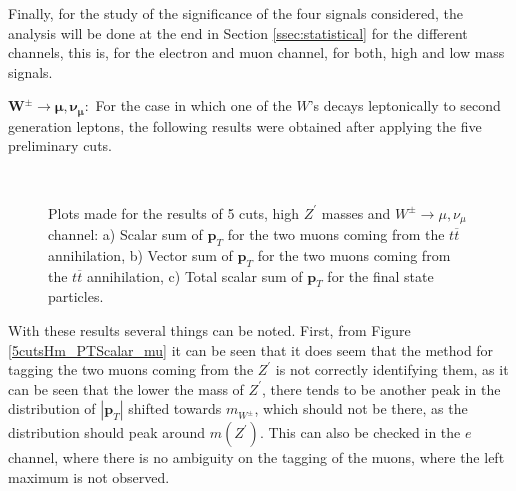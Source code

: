Finally, for the study of the significance of the four signals considered, the analysis will be done at the end in Section \ref{ssec:statistical} for the different channels, this is, for the electron and muon channel, for both, high and low mass signals.

$\bm{W^{\pm} \rightarrow \mu, \nu_{\mu}:}$ For the case in which one of the $W$'s decays leptonically to second generation leptons, the following results were obtained after applying the five preliminary cuts.

\begin{figure}[ht!]
     \begin{center}
        \\
    \end{center}
    \vspace{-1\baselineskip}
    \caption{Plots made for the results of 5 cuts, high $Z^{\prime}$ masses and $W^{\pm}\rightarrow \mu, \nu_{\mu}$ channel: a) Scalar sum of $\bm{p}_T$ for the two muons coming from the $t\overline{ t}$ annihilation, b) Vector sum of $\bm{p}_T$ for the two muons coming from the $t\overline{ t}$ annihilation, c) Total scalar sum of $\bm{p}_T$ for the final state particles.} 
   \label{5cutsHm_Results_mu}
\end{figure}

With these results several things can be noted. First, from Figure \ref{5cutsHm_PTScalar_mu} it can be seen that it does seem that the method for tagging the two muons coming from the $Z^{\prime}$ is not correctly identifying them, as it can be seen that the lower the mass of $Z^{\prime}$, there tends to be another peak in the distribution of $|\bm{p}_T|$ shifted towards $m_{W^{\pm}}$, which should not be there, as the distribution should peak around $m(Z^{\prime})$. This can also be checked in the $e$ channel, where there is no ambiguity on the tagging of the muons, where the left maximum is not observed. 

